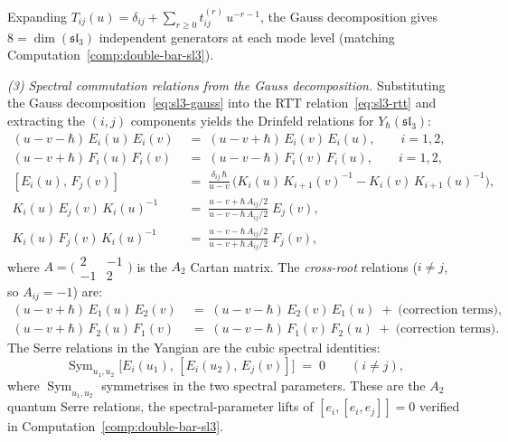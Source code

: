 \begin{example}
Expanding $T_{ij}(u) = \delta_{ij} + \sum_{r\ge 0}
t_{ij}^{(r)}\,u^{-r-1}$, the Gauss decomposition
gives $8 = \dim(\mathfrak{sl}_3)$ independent generators
at each mode level (matching
Computation~\ref{comp:double-bar-sl3}).

\medskip
\noindent\emph{(3) Spectral commutation relations from the
Gauss decomposition.}
Substituting the Gauss decomposition~\eqref{eq:sl3-gauss}
into the RTT relation~\eqref{eq:sl3-rtt} and extracting
the $(i,j)$ components yields the Drinfeld
relations for $Y_\hbar(\mathfrak{sl}_3)$:
\begin{align}
(u{-}v{-}\hbar)\,E_i(u)\,E_i(v)
&\;=\;
(u{-}v{+}\hbar)\,E_i(v)\,E_i(u),
\qquad i = 1,2,
\label{eq:sl3-EiEi}\\[3pt]
(u{-}v{+}\hbar)\,F_i(u)\,F_i(v)
&\;=\;
(u{-}v{-}\hbar)\,F_i(v)\,F_i(u),
\qquad i = 1,2,
\label{eq:sl3-FiFi}\\[3pt]
[E_i(u),\,F_j(v)]
&\;=\;
\frac{\delta_{ij}\,\hbar}{u{-}v}\,
\bigl(K_i(u)\,K_{i+1}(v)^{-1}
- K_i(v)\,K_{i+1}(u)^{-1}\bigr),
\label{eq:sl3-EF}\\[3pt]
K_i(u)\,E_j(v)\,K_i(u)^{-1}
&\;=\;
\frac{u-v+\hbar\,A_{ij}/2}
{u-v-\hbar\,A_{ij}/2}\;E_j(v),
\label{eq:sl3-KE}\\[3pt]
K_i(u)\,F_j(v)\,K_i(u)^{-1}
&\;=\;
\frac{u-v-\hbar\,A_{ij}/2}
{u-v+\hbar\,A_{ij}/2}\;F_j(v),
\label{eq:sl3-KF}
\end{align}
where $A = \bigl(\begin{smallmatrix}2&-1\\-1&2\end{smallmatrix}\bigr)$ is the $A_2$ Cartan matrix.
The \emph{cross-root} relations ($i\neq j$, so $A_{ij}=-1$)
are:
\begin{align}
(u{-}v{+}\hbar)\,E_1(u)\,E_2(v)
&\;=\;
(u{-}v{-}\hbar)\,E_2(v)\,E_1(u)
\;+\;\text{(correction terms)},
\label{eq:sl3-E1E2}\\[3pt]
(u{-}v{+}\hbar)\,F_2(u)\,F_1(v)
&\;=\;
(u{-}v{-}\hbar)\,F_1(v)\,F_2(u)
\;+\;\text{(correction terms)}.
\label{eq:sl3-F2F1}
\end{align}
The Serre relations in the Yangian are the cubic spectral
identities:
\begin{equation}\label{eq:sl3-serre}
\operatorname{Sym}_{u_1,u_2}
\bigl[E_i(u_1),\,[E_i(u_2),\,E_j(v)]\bigr]
\;=\;0
\qquad(i\neq j),
\end{equation}
where $\operatorname{Sym}_{u_1,u_2}$ symmetrises in the
two spectral parameters. These are the $A_2$ quantum Serre
relations, the spectral-parameter lifts of
$[e_i,[e_i,e_j]] = 0$ verified in
Computation~\ref{comp:double-bar-sl3}.


\end{example}
